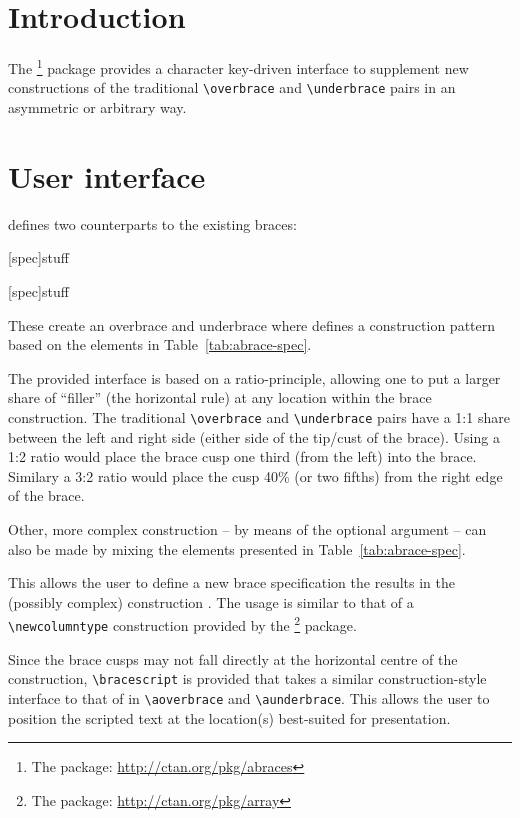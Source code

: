 \documentclass{ltxdockit}[2011/03/25]
\begin{document}
\printtitlepage

\section{Introduction} \label{intro}

The \footnote{The  package: \url{http://ctan.org/pkg/abraces}} package provides a character key-driven interface to supplement new constructions of the traditional \lstinline!\overbrace! and \lstinline!\underbrace! pairs in an asymmetric or arbitrary way.

\section{User interface} \label{user-interface}

 defines two counterparts to the existing braces:

\begin{ltxsyntax}

[spec]{stuff}

[spec]{stuff}

These create an overbrace and underbrace where  defines a construction pattern based on the elements in Table~\ref{tab:abrace-spec}.

The provided interface is based on a ratio-principle, allowing one to put a larger share of ``filler'' (the horizontal rule) at any location within the brace construction. The traditional \lstinline!\overbrace! and \lstinline!\underbrace! pairs have a \mbox{1:1} share between the left and right side (either side of the tip/cust of the brace). Using a \mbox{1:2} ratio would place the brace cusp one third (from the left) into the brace. Similary a \mbox{3:2} ratio would place the cusp 40\% (or two fifths) from the right edge of the brace.

Other, more complex construction -- by means of the optional  argument -- can also be made by mixing the elements presented in Table~\ref{tab:abrace-spec}.


This allows the user to define a new brace specification  the results in the (possibly complex) construction . The usage is similar to that of a \lstinline!\newcolumntype! construction provided by the \footnote{The  package: \url{http://ctan.org/pkg/array}} package.


Since the brace cusps may not fall directly at the horizontal centre of the construction, \lstinline|\bracescript| is provided that takes a similar construction-style interface to that of  in \lstinline|\aoverbrace| and \lstinline|\aunderbrace|. This allows the user to position the scripted text at the location(s) best-suited for presentation.

\end{ltxsyntax}
\end{document}
